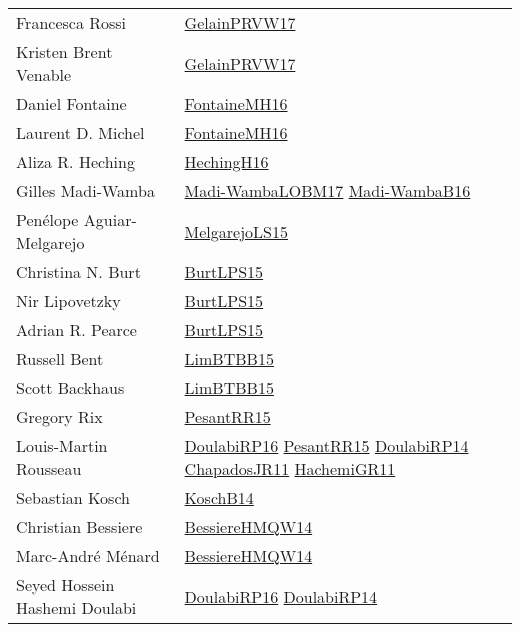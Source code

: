 {\begin{longtable}{p{4cm}p{15cm}}
Francesca Rossi & \href{papers/GelainPRVW17.pdf}{GelainPRVW17}\cite{GelainPRVW17} \\
Kristen Brent Venable & \href{papers/GelainPRVW17.pdf}{GelainPRVW17}\cite{GelainPRVW17} \\
Daniel Fontaine & \href{papers/FontaineMH16.pdf}{FontaineMH16}\cite{FontaineMH16} \\
Laurent D. Michel & \href{papers/FontaineMH16.pdf}{FontaineMH16}\cite{FontaineMH16} \\
Aliza R. Heching & \href{papers/HechingH16.pdf}{HechingH16}\cite{HechingH16} \\
Gilles Madi{-}Wamba & \href{papers/Madi-WambaLOBM17.pdf}{Madi-WambaLOBM17}\cite{Madi-WambaLOBM17} \href{papers/Madi-WambaB16.pdf}{Madi-WambaB16}\cite{Madi-WambaB16} \\
Pen{\'{e}}lope Aguiar{-}Melgarejo & \href{papers/MelgarejoLS15.pdf}{MelgarejoLS15}\cite{MelgarejoLS15} \\
Christina N. Burt & \href{papers/BurtLPS15.pdf}{BurtLPS15}\cite{BurtLPS15} \\
Nir Lipovetzky & \href{papers/BurtLPS15.pdf}{BurtLPS15}\cite{BurtLPS15} \\
Adrian R. Pearce & \href{papers/BurtLPS15.pdf}{BurtLPS15}\cite{BurtLPS15} \\
Russell Bent & \href{papers/LimBTBB15.pdf}{LimBTBB15}\cite{LimBTBB15} \\
Scott Backhaus & \href{papers/LimBTBB15.pdf}{LimBTBB15}\cite{LimBTBB15} \\
Gregory Rix & \href{papers/PesantRR15.pdf}{PesantRR15}\cite{PesantRR15} \\
Louis{-}Martin Rousseau & \href{articles/DoulabiRP16.pdf}{DoulabiRP16}\cite{DoulabiRP16} \href{papers/PesantRR15.pdf}{PesantRR15}\cite{PesantRR15} \href{papers/DoulabiRP14.pdf}{DoulabiRP14}\cite{DoulabiRP14} \href{papers/ChapadosJR11.pdf}{ChapadosJR11}\cite{ChapadosJR11} \href{articles/HachemiGR11.pdf}{HachemiGR11}\cite{HachemiGR11} \\
Sebastian Kosch & \href{papers/KoschB14.pdf}{KoschB14}\cite{KoschB14} \\
Christian Bessiere & \href{papers/BessiereHMQW14.pdf}{BessiereHMQW14}\cite{BessiereHMQW14} \\
Marc{-}Andr{\'{e}} M{\'{e}}nard & \href{papers/BessiereHMQW14.pdf}{BessiereHMQW14}\cite{BessiereHMQW14} \\
Seyed Hossein Hashemi Doulabi & \href{articles/DoulabiRP16.pdf}{DoulabiRP16}\cite{DoulabiRP16} \href{papers/DoulabiRP14.pdf}{DoulabiRP14}\cite{DoulabiRP14} \\

\end{longtable}}
